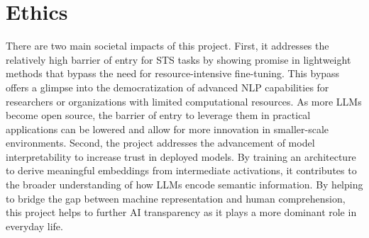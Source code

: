 \documentclass{article}
\begin{document}

\section{Ethics}
There are two main societal impacts of this project. First, it addresses the relatively high barrier of entry for STS tasks by showing promise in lightweight methods that bypass the need for resource-intensive fine-tuning. This bypass offers a glimpse into the democratization of advanced NLP capabilities for researchers or organizations with limited computational resources. As more LLMs become open source, the barrier of entry to leverage them in practical applications can be lowered and allow for more innovation in smaller-scale environments. Second, the project addresses the advancement of model interpretability to increase trust in deployed models. By training an architecture to derive meaningful embeddings from intermediate activations, it contributes to the broader understanding of how LLMs encode semantic information. By helping to bridge the gap between machine representation and human comprehension, this project helps to further AI transparency as it plays a more dominant role in everyday life. 
\end{document}
